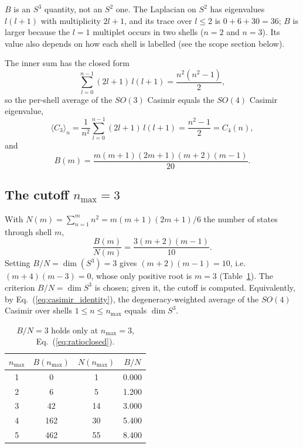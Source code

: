 \documentclass[aps,prl,twocolumn,superscriptaddress]{revtex4-2}
\begin{document}
$B$ is an $S^3$ quantity, not an $S^2$ one. The Laplacian on $S^2$ has
eigenvalues $l(l+1)$ with multiplicity $2l+1$, and its trace over
$l \le 2$ is $0 + 6 + 30 = 36$; $B$ is larger because the $l = 1$
multiplet occurs in two shells ($n = 2$ and $n = 3$). Its value also
depends on how each shell is labelled (see the scope section below).

The inner sum has the closed form
\begin{equation}\label{eq:innersum}
  \sum_{l=0}^{n-1}(2l+1)\,l(l+1) = \frac{n^2(n^2-1)}{2},
\end{equation}
so the per-shell average of the $SO(3)$ Casimir equals the $SO(4)$
Casimir eigenvalue,
\begin{equation}\label{eq:casimir_identity}
  \langle C_3 \rangle_n
  = \frac{1}{n^2}\sum_{l=0}^{n-1}(2l+1)\,l(l+1)
  = \frac{n^2-1}{2} = C_4(n),
\end{equation}
and
\begin{equation}\label{eq:Bclosed}
  B(m) = \frac{m(m+1)(2m+1)(m+2)(m-1)}{20}.
\end{equation}

\subsection{The cutoff $n_{\max} = 3$}

With $N(m) = \sum_{n=1}^{m} n^2 = m(m+1)(2m+1)/6$ the number of states
through shell $m$,
\begin{equation}\label{eq:ratioclosed}
  \frac{B(m)}{N(m)} = \frac{3(m+2)(m-1)}{10}.
\end{equation}
Setting $B/N = \dim(S^3) = 3$ gives $(m+2)(m-1) = 10$, i.e.\
$(m+4)(m-3) = 0$, whose only positive root is $m = 3$
(Table~\ref{tab:selection}). The criterion $B/N = \dim S^3$ is chosen;
given it, the cutoff is computed. Equivalently, by
Eq.~(\ref{eq:casimir_identity}), the degeneracy-weighted average of the
$SO(4)$ Casimir over shells $1 \le n \le n_{\max}$ equals $\dim S^3$.

\begin{table}[tb]
\centering
\begin{tabular}{cccc}
\hline\hline
$n_{\max}$ & $B(n_{\max})$ & $N(n_{\max})$ & $B/N$ \\
\hline
1 & 0   & 1  & 0.000 \\
2 & 6   & 5  & 1.200 \\
3 & 42  & 14 & 3.000 \\
4 & 162 & 30 & 5.400 \\
5 & 462 & 55 & 8.400 \\
\hline\hline
\end{tabular}
\caption{$B/N = 3$ holds only at $n_{\max} = 3$,
Eq.~(\ref{eq:ratioclosed}).}
\label{tab:selection}
\end{table}
\end{document}
